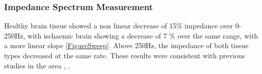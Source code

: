 \subsubsection{Impedance Spectrum Measurement}

Healthy brain tissue showed a non linear decrease of 15\% impedance over 0-250Hz, with ischaemic brain showing a decrease of 7 \% over the same range, with a more linear slope \ref{FigureSweep}. Above 250Hz, the impedance of both tissue types decreased at the same rate. These results were consistent with previous studies in the area \cite{Ranck_1963}, \cite{Logothetis_2007}.